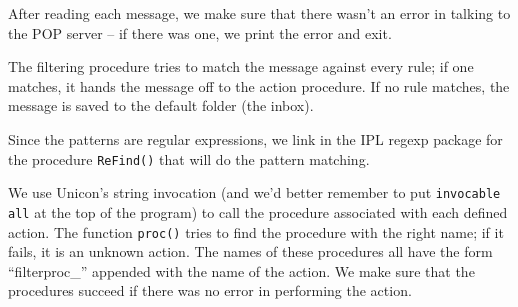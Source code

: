 After reading each message, we make sure that there
wasn't an error in talking to the POP server -- if
there was one, we print the error and exit.

The filtering procedure tries to match the message against every rule;
if one matches, it hands the message off to the action procedure. If no
rule matches, the message is saved to the default folder (the inbox).


Since the patterns are regular expressions, we link in the IPL regexp
package for the procedure \texttt{ReFind()} that will do the pattern
matching.


We use Unicon's string invocation (and
we'd better remember to put \texttt{invocable all} at
the top of the program) to call the procedure associated with each
defined action. The function \texttt{proc()} tries to find the
procedure with the right name; if it fails, it is an unknown action.
The names of these procedures all have the form
{\textquotedblleft}filterproc\_{\textquotedblright} appended with the
name of the action. We make sure that the procedures succeed if there
was no error in performing the action.

